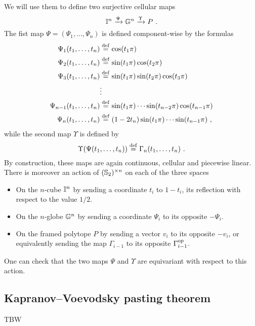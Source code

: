 We will use them to define two surjective cellular maps
\[
	\gcube^n \xra{\Psi} \globe^n \xra{\Upsilon} P \ .
\]
The fist map $\Psi=(\Psi_1,\ldots,\Psi_n)$ is defined component-wise by the formulas
\begin{align*}
	\Psi_1(t_1,\ldots,t_n) & \stackrel{\mathrm{def}}{=} \cos(t_1 \pi) \\
	\Psi_2(t_1,\ldots,t_n) & \stackrel{\mathrm{def}}{=} \sin(t_1 \pi)\cos(t_2\pi) \\
	\Psi_3(t_1,\ldots,t_n) & \stackrel{\mathrm{def}}{=} \sin(t_1 \pi)\sin(t_2\pi)\cos(t_3\pi) \\
	 & \vdots \\
	\Psi_{n-1}(t_1,\ldots,t_n) & \stackrel{\mathrm{def}}{=} \sin(t_1 \pi) \cdots \sin(t_{n-2} \pi) \cos(t_{n-1} \pi) \\
	\Psi_n(t_1,\ldots,t_n) & \stackrel{\mathrm{def}}{=} (1-2t_n) \sin(t_1 \pi) \cdots \sin(t_{n-1} \pi) \ ,
\end{align*}
while the second map $\Upsilon$ is defined by
\[ 
\Upsilon(\Psi(t_1,\ldots,t_n)) \stackrel{\mathrm{def}}{=} \Gamma_n(t_1,\ldots, t_n)\ . 
\]
By construction, these maps are again continuous, cellular and piecewise linear. 
There is moreover an action of $(\mathbb{S}_2)^{\times n}$ on each of the three spaces
\begin{itemize}
	\item On the $n$-cube $\mathbb{I}^n$ by sending a coordinate $t_i$ to $1-t_i$, its reflection with respect to the value $1/2$.
	\item On the $n$-globe $\mathbb{G}^n$ by sending a coordinate $\Psi_i$ to its opposite $-\Psi_i$.
	\item On the framed polytope $P$ by sending a vector $v_i$ to its opposite $-v_i$, or equivalently sending the map $\Gamma_{i-1}$ to its opposite $\Gamma_{i-1}^{\mathrm{op}}$. 
\end{itemize}
One can check that the two maps $\Psi$ and $\Upsilon$ are equivariant with respect to this action. 

\subsection{Kapranov--Voevodsky pasting theorem}

TBW